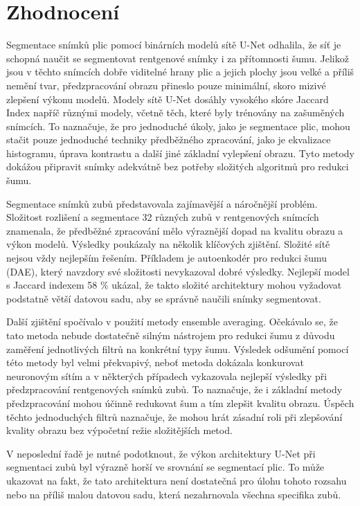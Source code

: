 \documentclass[male,czech,api_ing]{thesis}
\begin{document}
\chapter{Zhodnocení} 
Segmentace snímků plic pomocí binárních modelů sítě U-Net odhalila, že síť je schopná naučit se segmentovat rentgenové snímky i za přítomnosti šumu. Jelikož jsou v těchto snímcích dobře viditelné hrany plic a jejich plochy jsou velké a příliš nemění tvar, předzpracování obrazu přineslo pouze minimální, skoro mizivé zlepšení výkonu modelů. Modely sítě U-Net dosáhly vysokého skóre Jaccard Index napříč různými modely, včetně těch, které byly trénovány na zašuměných snímcích. To naznačuje, že pro jednoduché úkoly, jako je segmentace plic, mohou stačit pouze jednoduché techniky předběžného zpracování, jako je ekvalizace histogramu, úprava kontrastu a další jiné základní vylepšení obrazu. Tyto metody dokážou připravit snímky adekvátně bez potřeby složitých algoritmů pro redukci šumu.

Segmentace snímků zubů představovala zajímavější a náročnější problém. Složitost rozlišení a segmentace 32 různých zubů v rentgenových snímcích znamenala, že předběžné zpracování mělo výraznější dopad na kvalitu obrazu a výkon modelů. Výsledky poukázaly na několik klíčových zjištění. Složité sítě nejsou vždy nejlepším řešením. Příkladem je autoenkodér pro redukci šumu (DAE), který navzdory své složitosti nevykazoval dobré výsledky. Nejlepší model s Jaccard indexem 58 \% ukázal, že takto složité architektury mohou vyžadovat podstatně větší datovou sadu, aby se správně naučili snímky segmentovat.

Další zjištění spočívalo v použití metody ensemble averaging. Očekávalo se, že tato metoda nebude dostatečně silným nástrojem pro redukci šumu z důvodu zaměření jednotlivých filtrů na konkrétní typy šumu. Výsledek odšumění pomocí této metody byl velmi překvapivý, neboť metoda dokázala konkurovat neuronovým sítím a v některých případech vykazovala nejlepší výsledky při předzpracování rentgenových snímků zubů. To naznačuje, že i základní metody předzpracování mohou účinně redukovat šum a tím zlepšit kvalitu obrazu. Úspěch těchto jednoduchých filtrů naznačuje, že mohou hrát zásadní roli při zlepšování kvality obrazu bez výpočetní režie složitějších metod. 

V neposlední řadě je nutné podotknout, že výkon architektury U-Net při segmentaci zubů byl výrazně horší ve srovnání se segmentací plic. To může ukazovat na fakt, že tato architektura není dostatečná pro úlohu tohoto rozsahu nebo na příliš malou datovou sadu, která nezahrnovala všechna specifika zubů.
\end{document}
